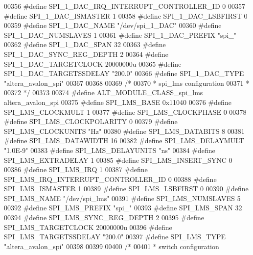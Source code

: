 \begin{DoxyCode}
00356 \textcolor{preprocessor}{#define SPI\_1\_DAC\_IRQ\_INTERRUPT\_CONTROLLER\_ID 0}
00357 \textcolor{preprocessor}{#define SPI\_1\_DAC\_ISMASTER 1}
00358 \textcolor{preprocessor}{#define SPI\_1\_DAC\_LSBFIRST 0}
00359 \textcolor{preprocessor}{#define SPI\_1\_DAC\_NAME "/dev/spi\_1\_DAC"}
00360 \textcolor{preprocessor}{#define SPI\_1\_DAC\_NUMSLAVES 1}
00361 \textcolor{preprocessor}{#define SPI\_1\_DAC\_PREFIX "spi\_"}
00362 \textcolor{preprocessor}{#define SPI\_1\_DAC\_SPAN 32}
00363 \textcolor{preprocessor}{#define SPI\_1\_DAC\_SYNC\_REG\_DEPTH 2}
00364 \textcolor{preprocessor}{#define SPI\_1\_DAC\_TARGETCLOCK 20000000u}
00365 \textcolor{preprocessor}{#define SPI\_1\_DAC\_TARGETSSDELAY "200.0"}
00366 \textcolor{preprocessor}{#define SPI\_1\_DAC\_TYPE "altera\_avalon\_spi"}
00367 
00368 
00369 \textcolor{comment}{/*}
00370 \textcolor{comment}{ * spi\_lms configuration}
00371 \textcolor{comment}{ *}
00372 \textcolor{comment}{ */}
00373 
00374 \textcolor{preprocessor}{#define ALT\_MODULE\_CLASS\_spi\_lms altera\_avalon\_spi}
00375 \textcolor{preprocessor}{#define SPI\_LMS\_BASE 0x11040}
00376 \textcolor{preprocessor}{#define SPI\_LMS\_CLOCKMULT 1}
00377 \textcolor{preprocessor}{#define SPI\_LMS\_CLOCKPHASE 0}
00378 \textcolor{preprocessor}{#define SPI\_LMS\_CLOCKPOLARITY 0}
00379 \textcolor{preprocessor}{#define SPI\_LMS\_CLOCKUNITS "Hz"}
00380 \textcolor{preprocessor}{#define SPI\_LMS\_DATABITS 8}
00381 \textcolor{preprocessor}{#define SPI\_LMS\_DATAWIDTH 16}
00382 \textcolor{preprocessor}{#define SPI\_LMS\_DELAYMULT "1.0E-9"}
00383 \textcolor{preprocessor}{#define SPI\_LMS\_DELAYUNITS "ns"}
00384 \textcolor{preprocessor}{#define SPI\_LMS\_EXTRADELAY 1}
00385 \textcolor{preprocessor}{#define SPI\_LMS\_INSERT\_SYNC 0}
00386 \textcolor{preprocessor}{#define SPI\_LMS\_IRQ 1}
00387 \textcolor{preprocessor}{#define SPI\_LMS\_IRQ\_INTERRUPT\_CONTROLLER\_ID 0}
00388 \textcolor{preprocessor}{#define SPI\_LMS\_ISMASTER 1}
00389 \textcolor{preprocessor}{#define SPI\_LMS\_LSBFIRST 0}
00390 \textcolor{preprocessor}{#define SPI\_LMS\_NAME "/dev/spi\_lms"}
00391 \textcolor{preprocessor}{#define SPI\_LMS\_NUMSLAVES 5}
00392 \textcolor{preprocessor}{#define SPI\_LMS\_PREFIX "spi\_"}
00393 \textcolor{preprocessor}{#define SPI\_LMS\_SPAN 32}
00394 \textcolor{preprocessor}{#define SPI\_LMS\_SYNC\_REG\_DEPTH 2}
00395 \textcolor{preprocessor}{#define SPI\_LMS\_TARGETCLOCK 20000000u}
00396 \textcolor{preprocessor}{#define SPI\_LMS\_TARGETSSDELAY "200.0"}
00397 \textcolor{preprocessor}{#define SPI\_LMS\_TYPE "altera\_avalon\_spi"}
00398 
00399 
00400 \textcolor{comment}{/*}
00401 \textcolor{comment}{ * switch configuration}

\end{DoxyCode}
